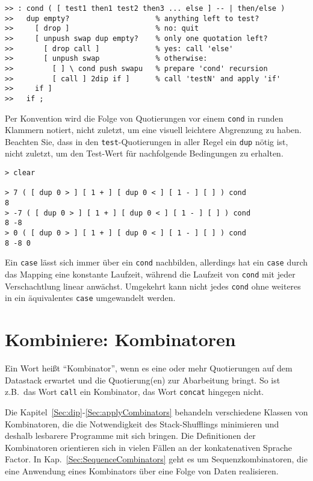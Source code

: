 \begin{verbatim}
>> : cond ( [ test1 then1 test2 then3 ... else ] -- | then/else )
>>   dup empty?                    % anything left to test?
>>     [ drop ]                    % no: quit
>>     [ unpush swap dup empty?    % only one quotation left?
>>       [ drop call ]             % yes: call 'else'
>>       [ unpush swap             % otherwise:
>>         [ ] \ cond push swapu   % prepare 'cond' recursion
>>         [ call ] 2dip if ]      % call 'testN' and apply 'if'
>>     if ]
>>   if ;
\end{verbatim}

Per Konvention wird die Folge von Quotierungen vor einem \verb|cond| in runden Klammern notiert, nicht zuletzt, um eine visuell leichtere Abgrenzung zu haben. Beachten Sie, dass in den \verb|test|-Quotierungen in aller Regel ein \verb|dup| nötig ist, nicht zuletzt, um den Test-Wert für nachfolgende Bedingungen zu erhalten.

\begin{verbatim}
> clear

> 7 ( [ dup 0 > ] [ 1 + ] [ dup 0 < ] [ 1 - ] [ ] ) cond
8
> -7 ( [ dup 0 > ] [ 1 + ] [ dup 0 < ] [ 1 - ] [ ] ) cond
8 -8
> 0 ( [ dup 0 > ] [ 1 + ] [ dup 0 < ] [ 1 - ] [ ] ) cond
8 -8 0
\end{verbatim}

Ein \verb|case| lässt sich immer über ein \verb|cond| nachbilden, allerdings hat ein \verb|case| durch das Mapping eine konstante Laufzeit, während die Laufzeit von \verb|cond| mit jeder Verschachtlung linear anwächst. Umgekehrt kann nicht jedes \verb|cond| ohne weiteres in ein äquivalentes \verb|case| umgewandelt werden.

\section{Kombiniere: Kombinatoren}
\label{Sec:Kombinatoren}

Ein Wort heißt "`Kombinator"', wenn es eine oder mehr Quotierungen auf dem Datastack erwartet und die Quotierung(en) zur Abarbeitung bringt. So ist z.B.\ das Wort \verb|call| ein Kombinator, das Wort \verb|concat| hingegen nicht.

Die Kapitel~\ref{Sec:dip}-\ref{Sec:applyCombinators} behandeln verschiedene Klassen von Kombinatoren, die die Notwendigkeit des Stack-Shufflings minimieren und deshalb lesbarere Programme mit sich bringen. Die Definitionen der Kombinatoren orientieren sich in vielen Fällen an der konkatenativen Sprache Factor.
In Kap.~\ref{Sec:SequenceCombinators} geht es um Sequenzkombinatoren, die eine Anwendung eines Kombinators über eine Folge von Daten realisieren.

